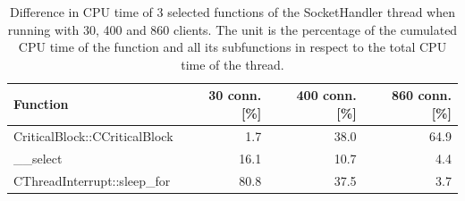 \begin{table}[!htbp]
\begin{center}
\begin{minipage}{\textwidth}
\begin{center}
\begin{tabular}{l|r|r|r}
\textbf{Function} & \textbf{30 conn. [\%]} & \textbf{400 conn. [\%]} & \textbf{860 conn. [\%]} \\
\hline
\small CriticalBlock::CCriticalBlock & 1.7 & 38.0 & 64.9\\
\small \_\_select & 16.1 & 10.7 & 4.4 \\
\small CThreadInterrupt::sleep\_for & 80.8 & 37.5 & 3.7 \\
\end{tabular}
\end{center}
\end{minipage}
\end{center}
\caption[Difference in CPU time of 3 selected functions of the SocketHandler thread.]{Difference in CPU time of 3 selected functions of the SocketHandler thread when running with 30, 400 and 860 clients. The unit is the percentage of the cumulated CPU time of the function and all its subfunctions in respect to the total CPU time of the thread.}
\label{tab:task_mix_socket}
\end{table}



